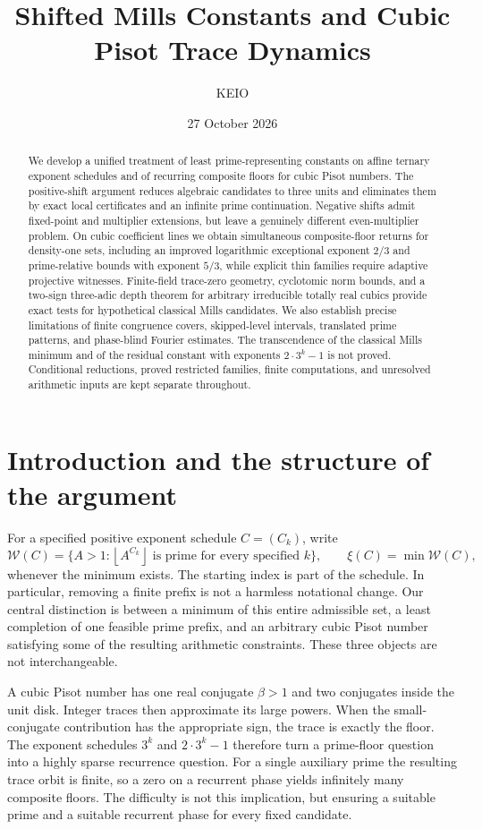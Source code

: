 \documentclass[11pt,a4paper]{article}
\title{Shifted Mills Constants and Cubic Pisot Trace Dynamics}
\author{KEIO}\date{27 October 2026}
\theoremstyle{definition}\newtheorem{definition}[theorem]{Definition}
\theoremstyle{remark}\newtheorem{remark}[theorem]{Remark}
\newcommand{\floor}[1]{\left\lfloor#1\right\rfloor}
\begin{document}
\maketitle
\begin{abstract}
We develop a unified treatment of least prime-representing constants on affine
ternary exponent schedules and of recurring composite floors for cubic Pisot
numbers. The positive-shift argument reduces algebraic candidates to three
units and eliminates them by exact local certificates and an infinite prime
continuation. Negative shifts admit fixed-point and multiplier extensions,
but leave a genuinely different even-multiplier problem. On cubic coefficient
lines we obtain simultaneous composite-floor returns for density-one sets,
including an improved logarithmic exceptional exponent $2/3$ and prime-relative bounds with exponent $5/3$, while explicit thin families
require adaptive projective witnesses. Finite-field trace-zero geometry,
cyclotomic norm bounds, and a two-sign three-adic depth theorem for arbitrary irreducible totally real cubics provide exact tests
for hypothetical classical Mills candidates. We also establish precise
limitations of finite congruence covers, skipped-level intervals, translated
prime patterns, and phase-blind Fourier estimates. The transcendence of the
classical Mills minimum and of the residual constant with exponents
$2\cdot3^k-1$ is not proved. Conditional reductions, proved restricted
families, finite computations, and unresolved arithmetic inputs are kept
separate throughout.
\end{abstract}
\tableofcontents
\clearpage
\section{Introduction and the structure of the argument}\label{sec:overview}
For a specified positive exponent schedule $C=(C_k)$, write
\[
 \mathcal W(C)=\{A>1:\floor{A^{C_k}}\text{ is prime for every specified }k\},
 \qquad \xi(C)=\min\mathcal W(C),
\]
whenever the minimum exists. The starting index is part of the schedule.
In particular, removing a finite prefix is not a harmless notational change.
Our central distinction is between a minimum of this entire admissible set,
a least completion of one feasible prime prefix, and an arbitrary cubic
Pisot number satisfying some of the resulting arithmetic constraints.
These three objects are not interchangeable.

A cubic Pisot number has one real conjugate $\beta>1$ and two conjugates
inside the unit disk. Integer traces then approximate its large powers.
When the small-conjugate contribution has the appropriate sign, the trace
is exactly the floor. The exponent schedules $3^k$ and $2\cdot3^k-1$
therefore turn a prime-floor question into a highly sparse recurrence
question. For a single auxiliary prime the resulting trace orbit is
finite, so a zero on a recurrent phase yields infinitely many composite
floors. The difficulty is not this implication, but ensuring a suitable
prime and a suitable recurrent phase for every fixed candidate.
\end{document}
